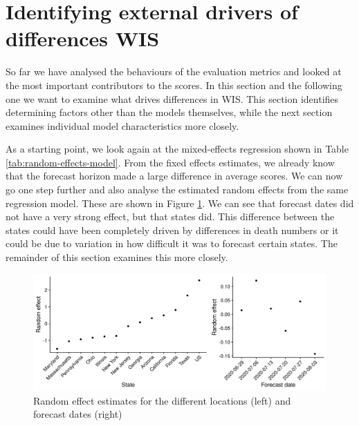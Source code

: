 \documentclass[
]{book}
\begin{document}
\hypertarget{external-drivers}{%
\section{Identifying external drivers of differences WIS}\label{external-drivers}}

So far we have analysed the behaviours of the evaluation metrics and looked at the most important contributors to the scores. In this section and the following one we want to examine what drives differences in WIS. This section identifies determining factors other than the models themselves, while the next section examines individual model characteristics more closely.

As a starting point, we look again at the mixed-effects regression shown in Table \ref{tab:random-effects-model}. From the fixed effects estimates, we already know that the forecast horizon made a large difference in average scores. We can now go one step further and also analyse the estimated random effects from the same regression model. These are shown in Figure \ref{fig:random-effects}. We can see that forecast dates did not have a very strong effect, but that states did. This difference between the states could have been completely driven by differences in death numbers or it could be due to variation in how difficult it was to forecast certain states. The remainder of this section examines this more closely.

\begin{figure}
\includegraphics[width=1\linewidth]{../visualisation/chapter-5-results/scenario-baseline/random-effects} \caption{Random effect estimates for the different locations (left) and forecast dates (right)}\label{fig:random-effects}
\end{figure}
\end{document}
